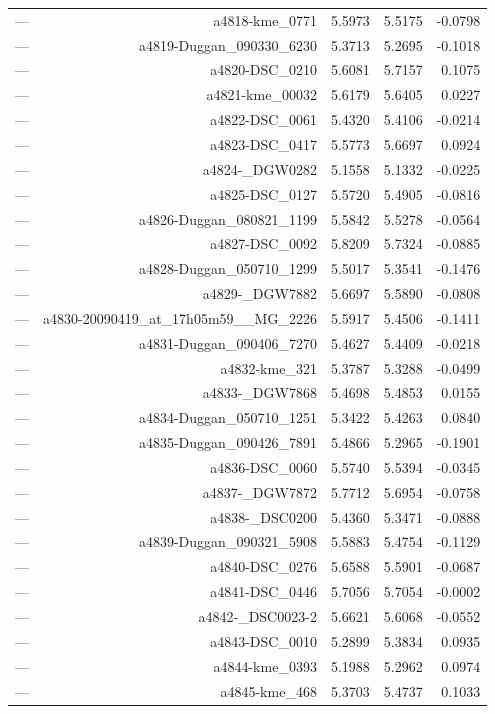 \begin{table}[htbp]
\begin{tabular}{lrrrr}
— & a4818-kme_0771 & 5.5973 & 5.5175 & -0.0798 \\
— & a4819-Duggan_090330_6230 & 5.3713 & 5.2695 & -0.1018 \\
— & a4820-DSC_0210 & 5.6081 & 5.7157 & 0.1075 \\
— & a4821-kme_00032 & 5.6179 & 5.6405 & 0.0227 \\
— & a4822-DSC_0061 & 5.4320 & 5.4106 & -0.0214 \\
— & a4823-DSC_0417 & 5.5773 & 5.6697 & 0.0924 \\
— & a4824-_DGW0282 & 5.1558 & 5.1332 & -0.0225 \\
— & a4825-DSC_0127 & 5.5720 & 5.4905 & -0.0816 \\
— & a4826-Duggan_080821_1199 & 5.5842 & 5.5278 & -0.0564 \\
— & a4827-DSC_0092 & 5.8209 & 5.7324 & -0.0885 \\
— & a4828-Duggan_050710_1299 & 5.5017 & 5.3541 & -0.1476 \\
— & a4829-_DGW7882 & 5.6697 & 5.5890 & -0.0808 \\
— & a4830-20090419_at_17h05m59__MG_2226 & 5.5917 & 5.4506 & -0.1411 \\
— & a4831-Duggan_090406_7270 & 5.4627 & 5.4409 & -0.0218 \\
— & a4832-kme_321 & 5.3787 & 5.3288 & -0.0499 \\
— & a4833-_DGW7868 & 5.4698 & 5.4853 & 0.0155 \\
— & a4834-Duggan_050710_1251 & 5.3422 & 5.4263 & 0.0840 \\
— & a4835-Duggan_090426_7891 & 5.4866 & 5.2965 & -0.1901 \\
— & a4836-DSC_0060 & 5.5740 & 5.5394 & -0.0345 \\
— & a4837-_DGW7872 & 5.7712 & 5.6954 & -0.0758 \\
— & a4838-_DSC0200 & 5.4360 & 5.3471 & -0.0888 \\
— & a4839-Duggan_090321_5908 & 5.5883 & 5.4754 & -0.1129 \\
— & a4840-DSC_0276 & 5.6588 & 5.5901 & -0.0687 \\
— & a4841-DSC_0446 & 5.7056 & 5.7054 & -0.0002 \\
— & a4842-_DSC0023-2 & 5.6621 & 5.6068 & -0.0552 \\
— & a4843-DSC_0010 & 5.2899 & 5.3834 & 0.0935 \\
— & a4844-kme_0393 & 5.1988 & 5.2962 & 0.0974 \\
— & a4845-kme_468 & 5.3703 & 5.4737 & 0.1033 \\

\end{tabular}
\end{table}
